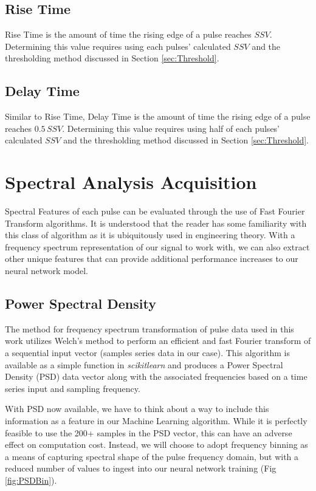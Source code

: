 \documentclass[conference]{IEEEtran}
\begin{document}
\subsection{Rise Time}
Rise Time is the amount of time the rising edge of a pulse reaches $SSV$. Determining this value requires using each pulses' calculated $SSV$ and the thresholding method discussed in Section \ref{sec:Threshold}.

\subsection{Delay Time}
Similar to Rise Time, Delay Time is the amount of time the rising edge of a pulse reaches $0.5\,SSV$. Determining this value requires using half of each pulses' calculated $SSV$ and the thresholding method discussed in Section \ref{sec:Threshold}.

\section{Spectral Analysis Acquisition}
Spectral Features of each pulse can be evaluated through the use of Fast Fourier Transform algorithms. It is understood that the reader has some familiarity with this class of algorithm as it is ubiquitously used in engineering theory. With a frequency spectrum representation of our signal to work with, we can also extract other unique features that can provide additional performance increases to our neural network model.

\subsection{Power Spectral Density}
The method for frequency spectrum transformation of pulse data used in this work utilizes Welch's method \cite{welch1967} to perform an efficient and fast Fourier transform of a sequential input vector (samples series data in our case). This algorithm is available as a simple function in \textit{scikitlearn} and produces a Power Spectral Density (PSD) data vector along with the associated frequencies based on a time series input and sampling frequency.

With PSD now available, we have to think about a way to include this information as a feature in our Machine Learning algorithm. While it is perfectly feasible to use the 200+ samples in the PSD vector, this can have an adverse effect on computation cost. Instead, we will choose to adopt frequency binning as a means of capturing spectral shape of the pulse frequency domain, but with a reduced number of values to ingest into our neural network training (Fig \ref{fig:PSDBin}).
\end{document}
